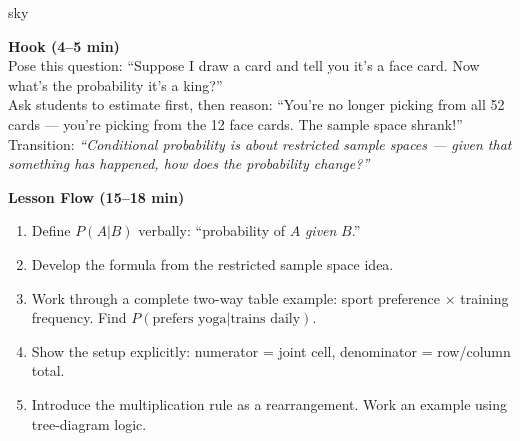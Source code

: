 \documentclass[10pt]{article}
\begin{document}
\begin{skillbox}{sky}
\begin{minipage}[t]{0.48\linewidth}
    \textbf{Hook (4--5 min)}\\
    Pose this question: ``Suppose I draw a card and tell you it's a face card.
    Now what's the probability it's a king?''\\[4pt]
    Ask students to estimate first, then reason: ``You're no longer picking from all
    52 cards --- you're picking from the 12 face cards. The sample space shrank!''\\[4pt]
    Transition: \textit{``Conditional probability is about restricted sample spaces ---
    given that something has happened, how does the probability change?''}
\end{minipage}
\hfill
\begin{minipage}[t]{0.48\linewidth}
    \textbf{Lesson Flow (15--18 min)}
    \begin{enumerate}
        \item Define $P(A|B)$ verbally: ``probability of $A$ \emph{given} $B$.''
        \item Develop the formula from the restricted sample space idea.
        \item Work through a complete two-way table example: sport preference $\times$
              training frequency. Find $P(\text{prefers yoga} | \text{trains daily})$.
        \item Show the setup explicitly: numerator = joint cell, denominator = row/column total.
        \item Introduce the multiplication rule as a rearrangement. Work an example
              using tree-diagram logic.
    \end{enumerate}
\end{minipage}
\end{skillbox}
\end{document}
